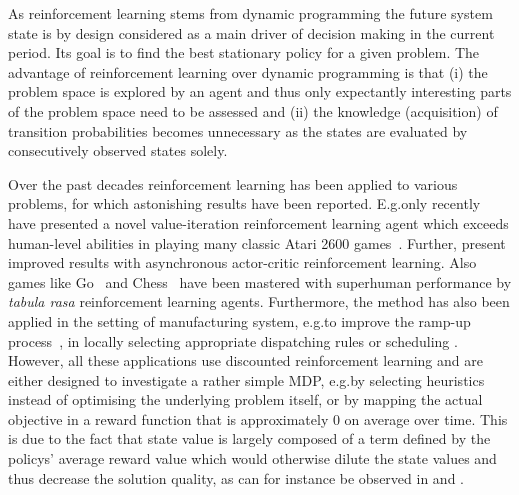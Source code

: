 \documentclass[envcountsame]{llncs}
\begin{document}
As reinforcement learning stems from dynamic programming the future system state is by design
considered as a main driver of decision making in the current period.
Its goal is to find the best stationary policy for a given problem. %
The advantage of reinforcement learning over dynamic programming is that (i) the problem
space is explored by an agent and thus only expectantly interesting parts of the problem space need
to be assessed and (ii) the knowledge (acquisition) of transition probabilities becomes unnecessary
as the states are evaluated by consecutively observed states solely.

Over the past decades reinforcement learning has been applied to various problems, for which
astonishing results have been reported. E.g.\@ only recently \citet{mnih2015human} have presented a
novel value-iteration reinforcement learning agent which exceeds human-level abilities in playing
many classic Atari 2600 games~\citep{bellemare2012investigating}. Further,
\citet{mnih2016asynchronous} present improved results with asynchronous actor-critic reinforcement
learning. Also games like Go~\citep{silver2016mastering} and Chess~\citep{silver2017mastering} have
been mastered with superhuman performance by \textit{tabula rasa} reinforcement learning agents.
Furthermore, the method has also been applied in the setting of manufacturing system, e.g.\@ to
improve the ramp-up process~\citep{doltsinis2012reinforcement}, in locally selecting appropriate
dispatching rules \citep{zhang1995reinforcement,wang2005application} or scheduling
\citep{zhang1995reinforcement, waschneck2018optimization}.
%
However, all these applications use discounted reinforcement learning and are either designed to
investigate a rather simple MDP, e.g.\@ by selecting heuristics instead of optimising the underlying
problem itself, or by mapping the actual objective in a reward function that is approximately \(0\)
on average over time.
%
This is due to the fact that state value is largely composed of a term defined by the policys'
average reward value \citep{MillerVeinott1969,Blackwell62} which would otherwise dilute the state
values and thus decrease the solution quality, as can for instance be observed in
\citet{SchneckenreitherHaeussler2019} and \citet{gijsbrechts2018can}.
%
\end{document}
